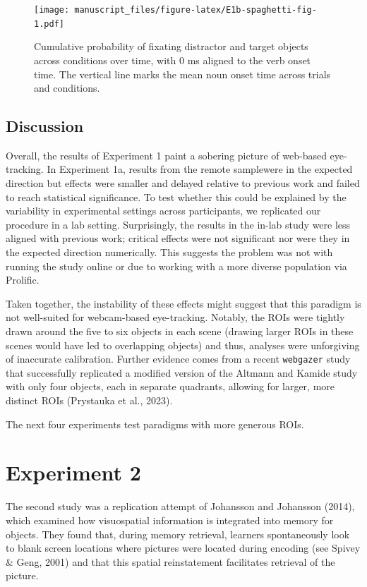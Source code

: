 \documentclass[
  man,floatsintext]{apa6}
\begin{document}
\begin{figure}
\centering
\texttt{[image: manuscript\_files/figure-latex/E1b-spaghetti-fig-1.pdf]}
\caption{\label{fig:E1b-spaghetti-fig}Cumulative probability of fixating distractor and target objects across conditions over time, with 0 ms aligned to the verb onset time. The vertical line marks the mean noun onset time across trials and conditions.}
\end{figure}

\subsection{Discussion}\label{discussion-1}

Overall, the results of Experiment 1 paint a sobering picture of web-based eye-tracking. In Experiment 1a, results from the remote samplewere in the expected direction but effects were smaller and delayed relative to previous work and failed to reach statistical significance. To test whether this could be explained by the variability in experimental settings across participants, we replicated our procedure in a lab setting. Surprisingly, the results in the in-lab study were less aligned with previous work; critical effects were not significant nor were they in the expected direction numerically. This suggests the problem was not with running the study online or due to working with a more diverse population via Prolific.

Taken together, the instability of these effects might suggest that this paradigm is not well-suited for webcam-based eye-tracking. Notably, the ROIs were tightly drawn around the five to six objects in each scene (drawing larger ROIs in these scenes would have led to overlapping objects) and thus, analyses were unforgiving of inaccurate calibration. Further evidence comes from a recent \texttt{webgazer} study that successfully replicated a modified version of the Altmann and Kamide study with only four objects, each in separate quadrants, allowing for larger, more distinct ROIs (Prystauka et al., 2023).

The next four experiments test paradigms with more generous ROIs.

\section{Experiment 2}\label{experiment-2}

The second study was a replication attempt of Johansson and Johansson (2014),
which examined how visuospatial information is integrated into memory
for objects. They found that, during memory retrieval, learners
spontaneously look to blank screen locations where pictures were located
during encoding (see Spivey \& Geng, 2001) and that
this spatial reinstatement facilitates retrieval of the picture.
\end{document}
